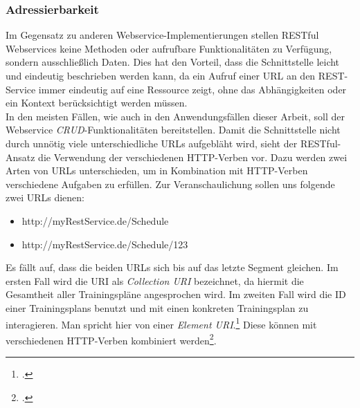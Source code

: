 \subsubsection*{Adressierbarkeit}
Im Gegensatz zu anderen Webservice-Implementierungen stellen \ac{REST}ful Webservices keine Methoden oder aufrufbare Funktionalitäten zu Verfügung, sondern ausschließlich Daten. Dies hat den Vorteil, dass die Schnittstelle leicht und eindeutig beschrieben werden kann, da ein Aufruf einer \ac{URL} an den \ac{REST}-Service immer eindeutig auf eine Ressource zeigt, ohne das Abhängigkeiten oder ein Kontext berücksichtigt werden müssen. \\
In den meisten Fällen, wie auch in den Anwendungsfällen dieser Arbeit, soll der Webservice \textit{\ac{CRUD}}-Funktionalitäten bereitstellen. Damit die Schnittstelle nicht durch unnötig viele unterschiedliche \ac{URL}s aufgebläht wird, sieht der \ac{REST}ful-Ansatz die Verwendung der verschiedenen \ac{HTTP}-Verben vor. Dazu werden zwei Arten von URLs unterschieden, um in Kombination mit \ac{HTTP}-Verben verschiedene Aufgaben zu erfüllen. Zur Veranschaulichung sollen uns folgende zwei \ac{URL}s dienen:
\begin{itemize}
\item http://myRestService.de/Schedule
\item http://myRestService.de/Schedule/123
\end{itemize}
Es fällt auf, dass die beiden \ac{URL}s sich bis auf das letzte Segment gleichen. Im ersten Fall wird die \ac{URI} als \textit{Collection \ac{URI}} bezeichnet, da hiermit die Gesamtheit aller Trainingspläne angesprochen wird. Im zweiten Fall wird die ID einer Trainingsplans benutzt und mit einen konkreten Trainingsplan zu interagieren. Man spricht hier von einer \textit{Element \ac{URI}}.\footcite[S. 12ff.]{Building-a-REST-Service} Diese können mit verschiedenen \ac{HTTP}-Verben kombiniert werden\footcite[S. 26ff.]{REST-und-HTTP}.

